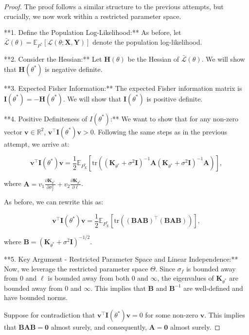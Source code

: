 \begin{proof}
The proof follows a similar structure to the previous attempts, but crucially, we now work within a restricted parameter space.

**1. Define the Population Log-Likelihood:**
As before, let $\bar{\mathcal{L}}(\theta) = \mathbb{E}_{P^*}[\mathcal{L}(\theta; \mathbf{X}, \mathbf{Y})]$ denote the population log-likelihood.

**2. Consider the Hessian:**
Let $\mathbf{H}(\theta)$ be the Hessian of $\bar{\mathcal{L}}(\theta)$. We will show that $\mathbf{H}(\theta^*)$ is negative definite.

**3. Expected Fisher Information:**
The expected Fisher information matrix is $\mathbf{I}(\theta^*) = -\mathbf{H}(\theta^*)$. We will show that $\mathbf{I}(\theta^*)$ is positive definite.

**4. Positive Definiteness of $I(\theta^*)$:**
We want to show that for any non-zero vector $\mathbf{v} \in \mathbb{R}^2$, $\mathbf{v}^\top \mathbf{I}(\theta^*) \mathbf{v} > 0$. Following the same steps as in the previous attempt, we arrive at:

$$
\mathbf{v}^\top \mathbf{I}(\theta^*) \mathbf{v} = \frac{1}{2} \mathbb{E}_{P^*_X}\left[ \text{tr}\left( (\mathbf{K}_{\theta^*} + \sigma^2 \mathbf{I})^{-1} \mathbf{A} (\mathbf{K}_{\theta^*} + \sigma^2 \mathbf{I})^{-1} \mathbf{A} \right) \right],
$$

where $\mathbf{A} = v_1 \frac{\partial \mathbf{K}_{\theta^*}}{\partial \sigma_f^2} + v_2 \frac{\partial \mathbf{K}_{\theta^*}}{\partial \ell}$.

As before, we can rewrite this as:

$$
\mathbf{v}^\top \mathbf{I}(\theta^*) \mathbf{v} = \frac{1}{2} \mathbb{E}_{P^*_X}\left[ \text{tr}\left( (\mathbf{B} \mathbf{A} \mathbf{B})^\top (\mathbf{B} \mathbf{A} \mathbf{B}) \right) \right],
$$

where $\mathbf{B} = (\mathbf{K}_{\theta^*} + \sigma^2 \mathbf{I})^{-1/2}$.

**5. Key Argument - Restricted Parameter Space and Linear Independence:**
Now, we leverage the restricted parameter space $\Theta$. Since $\sigma_f$ is bounded away from 0 and $\ell$ is bounded away from both 0 and $\infty$, the eigenvalues of $\mathbf{K}_{\theta^*}$ are bounded away from 0 and $\infty$. This implies that $\mathbf{B}$ and $\mathbf{B}^{-1}$ are well-defined and have bounded norms.

Suppose for contradiction that $\mathbf{v}^\top \mathbf{I}(\theta^*) \mathbf{v} = 0$ for some non-zero $\mathbf{v}$. This implies that $\mathbf{B}\mathbf{A}\mathbf{B} = \mathbf{0}$ almost surely, and consequently, $\mathbf{A} = \mathbf{0}$ almost surely.


\end{proof}
